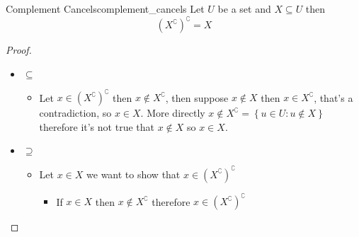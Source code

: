 \begin{proposition}{Complement Cancels}{complement_cancels}
    Let $ U$ be a set and $ X \subseteq U$ then
    \[
    \left(X ^{\complement}  \right) ^{\complement} =  X
    \]
\end{proposition}
\begin{proof}
    \begin{itemize}
        \item $ \subseteq$ 
        \begin{itemize}
            \item Let $x \in \left(X ^{\complement}  \right) ^{\complement}$
            then $x \not\in X ^{\complement}$, then suppose $x \not\in X$ then
            $x \in X ^{\complement}$, that's a contradiction, so $x \in X$. More
            directly $x \not\in X ^{\complement} = \left\{ u \in U: u \not\in X
            \right\}$ therefore it's not true that $x \not\in X$ so $x \in X$.
        \end{itemize}
        \item $ \supseteq$ 
        \begin{itemize}
            \item Let $x \in X$ we want to show that $x \in \left(X
            ^{\complement}  \right) ^{\complement}$ 
            \begin{itemize}
                \item If $x \in X$ then $x \not\in X ^{\complement}$ therefore
                $x \in \left(X ^{\complement}  \right) ^{\complement}$
            \end{itemize}
        \end{itemize}
    \end{itemize}
\end{proof}
